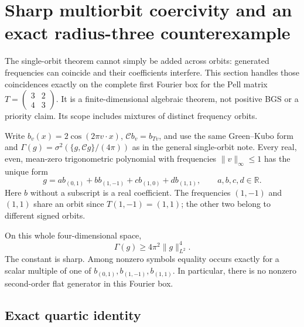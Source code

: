 \section{Sharp multiorbit coercivity and an exact radius-three counterexample}\label{sec:four_mode}
The single-orbit theorem cannot simply be added across orbits: generated frequencies can coincide and their coefficients interfere. This section handles those coincidences exactly on the complete first Fourier box for the Pell matrix \(T=\left(\begin{smallmatrix}3&2\\4&3\end{smallmatrix}\right)\). It is a finite-dimensional algebraic theorem, not positive BGS or a priority claim. Its scope includes mixtures of distinct frequency orbits.

Write \(b_v(x)=2\cos(2\pi v\cdot x)\), \(\mathcal Cb_v=b_{Tv}\), and use the same Green--Kubo form and \(\Gamma(g)=\sigma^2(\{g,\mathcal Cg\}/(4\pi))\) as in the general single-orbit note. Every real, even, mean-zero trigonometric polynomial with frequencies \(\|v\|_\infty\leq1\) has the unique form \[
 g=a b_{(0,1)}+b b_{(1,-1)}+c b_{(1,0)}+d b_{(1,1)},
             \qquad a,b,c,d\in\mathbb R.                    \tag{FM.B1}
\] Here \(b\) without a subscript is a real coefficient. The frequencies \((1,-1)\) and \((1,1)\) share an orbit since \(T(1,-1)=(1,1)\); the other two belong to different signed orbits.

\begin{theorem}\label{pass1:four_mode-1} On this whole four-dimensional space, \[
             \boxed{\Gamma(g)\geq4\pi^2\|g\|_{L^2}^4.}      \tag{FM.B2}
\] The constant is sharp. Among nonzero symbols equality occurs exactly for a scalar multiple of one of \(b_{(0,1)},b_{(1,-1)},b_{(1,1)}\). In particular, there is no nonzero second-order flat generator in this Fourier box.
\end{theorem}

\subsection{Exact quartic identity}\label{four_mode:exact-quartic-identity}

